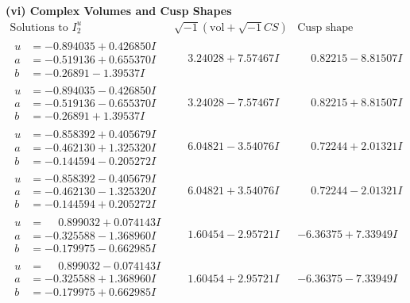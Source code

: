 \documentclass[1p]{elsarticle_modified}
\theoremstyle{definition}
\newcommand{\I}{\sqrt{-1}}
\begin{document}
\newpage\flushleft \textbf{(vi) Complex Volumes and Cusp Shapes}
$$\begin{array}{c|c|c}  
\text{Solutions to }I^u_{2}& \I (\text{vol} + \sqrt{-1}CS) & \text{Cusp shape}\\
 \hline 
\begin{aligned}
u &= -0.894035 + 0.426850 I \\
a &= -0.519136 + 0.655370 I \\
b &= -0.26891 - 1.39537 I\end{aligned}
 & \phantom{-}3.24028 + 7.57467 I & \phantom{-}0.82215 - 8.81507 I \\ \hline\begin{aligned}
u &= -0.894035 - 0.426850 I \\
a &= -0.519136 - 0.655370 I \\
b &= -0.26891 + 1.39537 I\end{aligned}
 & \phantom{-}3.24028 - 7.57467 I & \phantom{-}0.82215 + 8.81507 I \\ \hline\begin{aligned}
u &= -0.858392 + 0.405679 I \\
a &= -0.462130 + 1.325320 I \\
b &= -0.144594 - 0.205272 I\end{aligned}
 & \phantom{-}6.04821 - 3.54076 I & \phantom{-}0.72244 + 2.01321 I \\ \hline\begin{aligned}
u &= -0.858392 - 0.405679 I \\
a &= -0.462130 - 1.325320 I \\
b &= -0.144594 + 0.205272 I\end{aligned}
 & \phantom{-}6.04821 + 3.54076 I & \phantom{-}0.72244 - 2.01321 I \\ \hline\begin{aligned}
u &= \phantom{-}0.899032 + 0.074143 I \\
a &= -0.325588 - 1.368960 I \\
b &= -0.179975 - 0.662985 I\end{aligned}
 & \phantom{-}1.60454 - 2.95721 I & -6.36375 + 7.33949 I \\ \hline\begin{aligned}
u &= \phantom{-}0.899032 - 0.074143 I \\
a &= -0.325588 + 1.368960 I \\
b &= -0.179975 + 0.662985 I\end{aligned}
 & \phantom{-}1.60454 + 2.95721 I & -6.36375 - 7.33949 I \\ \hline\begin{aligned}

\end{aligned}
\end{array}$$
\end{document}
